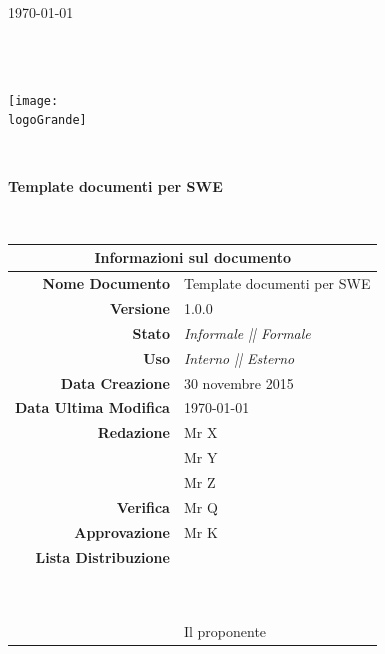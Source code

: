 \documentclass[12pt,a4paper]{article}
\title{\titoloDocumento}
\newcommand{\titoloDocumento}{Template documenti per SWE}
\newcommand{\dataCreazione}{30 novembre 2015}
\newcommand{\versione}{1.0.0}
\newcommand{\stato}{Informale || Formale}
\newcommand{\uso}{Interno || Esterno}
\begin{document}
\begin{titlepage}
\begin{center}
\today \\
\vspace{1cm}
\begin{Huge}
\textbf{\nomeGruppo} \\
\end{Huge}
\textbf{\prjL} \\
\vspace{1cm}
\texttt{[image: \\logoGrande]}
\vspace{1cm}

\HRule \\[0.4cm]
\begin{Huge}
{\huge \bfseries \titoloDocumento}\\[0.4cm]
\end{Huge}
\HRule \\[1cm]
\vfill

\begin{table}[h]
\begin{center}
\begin{tabular}{r | l}
\multicolumn{2}{c}{\textbf{Informazioni sul documento}}\\
\midrule
\textbf{Nome Documento}	&	\titoloDocumento	\\
\textbf{Versione}	&	\versione	\\
\textbf{Stato}	&	\emph{\stato}	\\
\textbf{Uso}	&	\emph{\uso}	\\
\textbf{Data Creazione}	&	\dataCreazione	\\
\textbf{Data Ultima Modifica}	&	\today	\\
\textbf{Redazione}	&	Mr X	\\
\ 	&	Mr Y	\\
\ 	&	Mr Z	\\
\textbf{Verifica}	&	Mr Q	\\
\textbf{Approvazione}	&	Mr K	\\
\textbf{Lista Distribuzione}	&	\nomeGruppo	\\
\ 	&	\Vardanega	\\
\ 	&	\Cardin	\\
\ 	&	Il proponente \Zucchetti	\\

\end{tabular}
\end{center}
\end{table}

\end{center}
\end{titlepage}
\newpage
\end{document}
